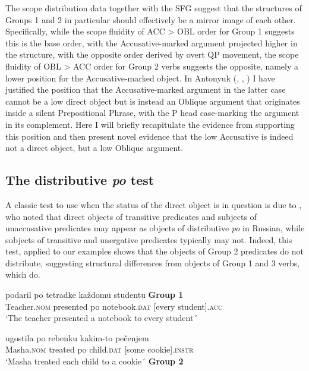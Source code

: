 \documentclass[output=paper,colorlinks,citecolor=brown]{./langscibook}
\begin{document}
The scope distribution data together with the SFG suggest that the structures of Groups 1 and 2 in particular should effectively be a mirror image of each other. Specifically, while the scope fluidity of ACC > OBL order for Group 1 suggests this is the base order, with the Accusative-marked argument projected higher in the structure, with the opposite order derived by overt QP movement, the scope fluidity of OBL > ACC order for Group 2 verbs suggests the opposite, namely a lower position for the Accusative-marked object. In Antonyuk (\citeyear{Antonyuk2015}, \citeyear{Antonyuk2017}, \citeyear{Antonyuk2018}) I have justified the position that the Accusative-marked argument in the latter case cannot be a low direct object but is instead an Oblique argument that originates inside a silent Prepositional Phrase, with the P head case-marking the argument in its complement. Here I will briefly recapitulate the evidence from \citet{Antonyuk2015} supporting this position and then present novel evidence that the low Accusative is indeed not a direct object, but a low Oblique argument.

\subsection{The distributive \textit{po} test}\label{sec:antonyuk:3.1}

A classic test to use when the status of the direct object is in question is due to \citet{Pesetsky1982}, who noted that direct objects of transitive predicates and subjects of unaccusative predicates may appear as objects of distributive \textit{po} in Russian, while subjects of transitive and unergative predicates typically may not. Indeed, this test, applied to our examples shows that the objects of Group 2 predicates do not distribute, suggesting structural differences from objects of Group 1 and 3 verbs, which do.


\ea%
    \label{ex:antonyuk:22}
                {podaril}    {po} {tetradke}            {každomu} {studentu} \hfill \textbf{Group 1}\\
    Teacher.\textsc{nom} presented po notebook.\textsc{dat} [every      student].\textsc{acc}\\
    \glt `The teacher presented a notebook to every student´
    \z

\ea%
    \label{ex:antonyuk:23}
                {ugostila} {po} {rebenku}     {kakim-to} {pečenjem}\\
    Masha.\textsc{nom} treated   po child.\textsc{dat} [some       cookie].\textsc{instr}\\
    \glt `Masha treated each child to a cookie´ \hfill \textbf{Group 2}
    \z
\end{document}
